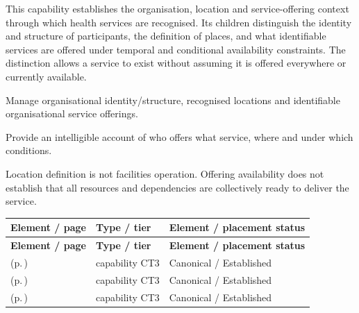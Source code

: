 This capability establishes the organisation, location and service-offering context through which health services are recognised. Its children distinguish the identity and structure of participants, the definition of places, and what identifiable services are offered under temporal and conditional availability constraints. The distinction allows a service to exist without assuming it is offered everywhere or currently available.



Manage organisational identity/\allowbreak{}structure, recognised locations and identifiable organisational service offerings.



Provide an intelligible account of who offers what service, where and under which conditions.



Location definition is not facilities operation. Offering availability does not establish that all resources and dependencies are collectively ready to deliver the service.


\begingroup\small\setlength{\TableWidth}{\dimexpr\linewidth-6\tabcolsep-4\arrayrulewidth\relax}
\begin{longtable}{|>{\raggedright\arraybackslash}p{0.52\TableWidth}|>{\raggedright\arraybackslash}p{0.2\TableWidth}|>{\raggedright\arraybackslash}p{0.28\TableWidth}|}
\hline\rowcolor{TableHead}\textbf{Element / page} & \textbf{Type / tier} & \textbf{Element / placement status}\\\hline\endfirsthead
\hline\rowcolor{TableHead}\textbf{Element / page} & \textbf{Type / tier} & \textbf{Element / placement status}\\\hline\endhead
\hline\endfoot
\nameref{cap:bc-healthcare-organisation-identity-structure-management} (p.\,\pageref{cap:bc-healthcare-organisation-identity-structure-management}) & capability CT3 & Canonical / Established\\\hline
\nameref{cap:bc-healthcare-location-definition-management} (p.\,\pageref{cap:bc-healthcare-location-definition-management}) & capability CT3 & Canonical / Established\\\hline
\nameref{cap:bc-healthcare-service-offering-management} (p.\,\pageref{cap:bc-healthcare-service-offering-management}) & capability CT3 & Canonical / Established\\\hline
\end{longtable}\endgroup

